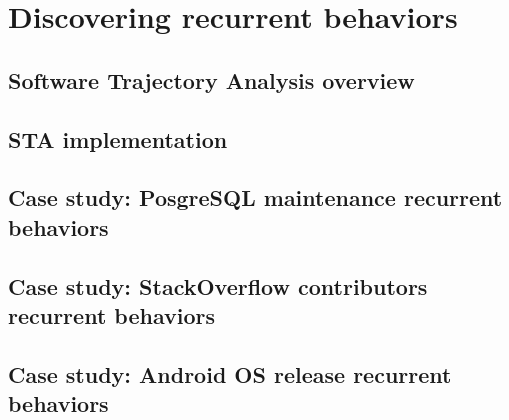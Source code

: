\chapter{Discovering recurrent behaviors}\label{chapter_sta}
\section{Software Trajectory Analysis overview}
\section{STA implementation}
\section{Case study: PosgreSQL maintenance recurrent behaviors}
\section{Case study: StackOverflow contributors recurrent behaviors}
\section{Case study: Android OS release recurrent behaviors}
